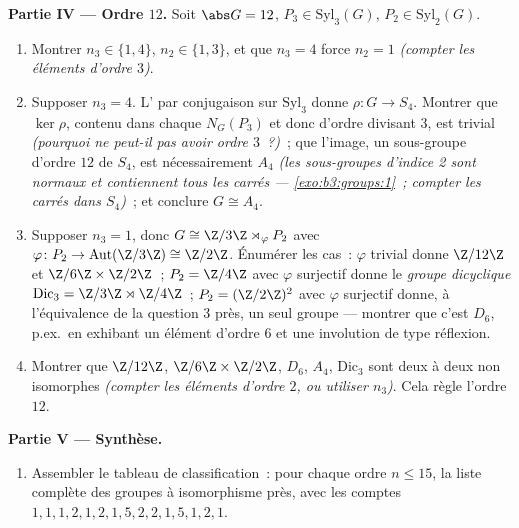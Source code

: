 \begin{problem}
\medskip
\noindent\textbf{Partie IV --- Ordre $12$.} Soit $\abs G = 12$,
$P_3 \in \mathrm{Syl}_3(G)$, $P_2 \in \mathrm{Syl}_2(G)$.
\begin{enumerate}[resume]
  \item Montrer $n_3 \in \{1, 4\}$, $n_2 \in \{1, 3\}$, et que
        $n_3 = 4$ force $n_2 = 1$ \emph{(compter les éléments
        d'ordre $3$)}.
  \item Supposer $n_3 = 4$. L' par conjugaison sur
        $\mathrm{Syl}_3$ donne $\rho \colon G \to S_4$. Montrer
        que $\ker \rho$, contenu dans chaque $N_G(P_3)$ et donc
        d'ordre divisant $3$, est trivial \emph{(pourquoi ne
        peut-il pas avoir ordre $3$~?)}~; que l'image, un
        sous-groupe d'ordre $12$ de $S_4$, est nécessairement
        $A_4$ \emph{(les sous-groupes d'indice 2 sont normaux et
        contiennent tous les carrés ---
        \cref{exo:b3:groups:1}~; compter les carrés dans $S_4$)}~;
        et conclure $G \cong A_4$.
  \item Supposer $n_3 = 1$, donc $G \cong \Z/3\Z \rtimes_\varphi
        P_2$ avec $\varphi \colon P_2 \to
        \operatorname{Aut}(\Z/3\Z) \cong \Z/2\Z$. Énumérer les
        cas~: $\varphi$ trivial donne $\Z/12\Z$ et $\Z/6\Z
        \times \Z/2\Z$~; $P_2 = \Z/4\Z$ avec $\varphi$ surjectif
        donne le \emph{groupe dicyclique} $\mathrm{Dic}_3 =
        \Z/3\Z \rtimes \Z/4\Z$~; $P_2 = (\Z/2\Z)^2$ avec
        $\varphi$ surjectif donne, à l'équivalence de la question
        3 près, un seul groupe --- montrer que c'est $D_6$,
        p.ex.\ en exhibant un élément d'ordre $6$ et une
        involution de type réflexion.
  \item Montrer que $\Z/12\Z$, $\Z/6\Z \times \Z/2\Z$, $D_6$,
        $A_4$, $\mathrm{Dic}_3$ sont deux à deux non isomorphes
        \emph{(compter les éléments d'ordre $2$, ou utiliser
        $n_3$)}. Cela règle l'ordre $12$.
\end{enumerate}

\medskip
\noindent\textbf{Partie V --- Synthèse.}
\begin{enumerate}[resume]
  \item Assembler le tableau de classification~: pour chaque
        ordre $n \leq 15$, la liste complète des groupes à
        isomorphisme près, avec les comptes $1, 1, 1, 2, 1, 2,
        1, 5, 2, 2, 1, 5, 1, 2, 1$.
\end{enumerate}


\end{problem}
